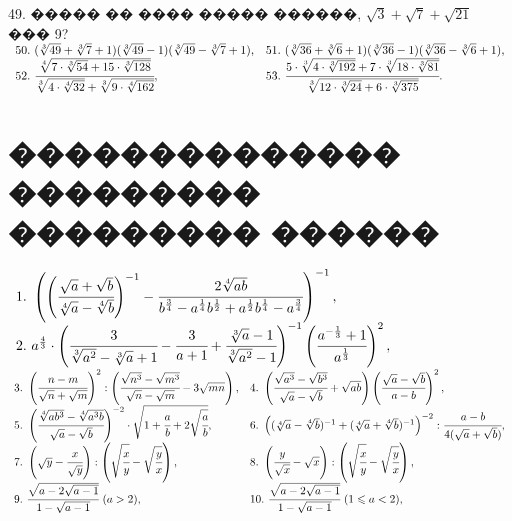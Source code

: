 \documentclass[12pt]{article}
\begin{document}
49. ����� �� ���� ����� ������, $\sqrt{3}+\sqrt{7}+\sqrt{21}$ ��� 9?\\
$\begin{array}{ll}
50.\ (\sqrt[3]{49}+\sqrt[3]{7}+1)(\sqrt[3]{49}-1)(\sqrt[3]{49}-\sqrt[3]{7}+1),&
51.\ (\sqrt[3]{36}+\sqrt[3]{6}+1)(\sqrt[3]{36}-1)(\sqrt[3]{36}-\sqrt[3]{6}+1),\\
52.\ \cfrac{\sqrt[4]{7\cdot\sqrt[3]{54}+15\cdot\sqrt[3]{128}}}{\sqrt[3]{4\cdot\sqrt[4]{32}}+\sqrt[3]{9\cdot\sqrt[4]{162}}},&
53.\ \cfrac{5\cdot\sqrt[3]{4\cdot\sqrt[3]{192}}+7\cdot\sqrt[3]{18\cdot\sqrt[3]{81}}}{\sqrt[3]{12\cdot
\sqrt[3]{24}+6\cdot\sqrt[3]{375}}}.
\end{array}$
\newpage
\section{�������������� ��������� ��������� ������}
$\begin{array}{ll}
1.\ \left(\left(\cfrac{\sqrt{a}+\sqrt{b}}{\sqrt[4]{a}-\sqrt[4]{b}}\right)^{-1}-
\cfrac{2\sqrt[4]{ab}}{b^{\frac{3}{4}}-a^{\frac{1}{4}}b^{\frac{1}{2}}+
a^{\frac{1}{2}}b^{\frac{1}{4}}-a^{\frac{3}{4}}}\right)^{-1},\\
2.\ a^{\frac{4}{3}}\cdot\left(\cfrac{3}{\sqrt[3]{a^2}-\sqrt[3]{a}+1}-
\cfrac{3}{a+1}+\cfrac{\sqrt[3]{a}-1}{\sqrt[3]{a^2}-1}\right)^{-1}
\left(\cfrac{a^{-\frac{1}{3}}+1}{a^\frac{1}{3}}\right)^2,\\
\end{array}$\\
$\begin{array}{ll}
3.\ \left(\cfrac{n-m}{\sqrt{n}+\sqrt{m}}\right)^2:\left(\cfrac{\sqrt{n^3}-\sqrt{m^3}}{\sqrt{n}-\sqrt{m}}-
3\sqrt{mn}\right),&
4.\ \left(\cfrac{\sqrt{a^3}-\sqrt{b^3}}{\sqrt{a}-\sqrt{b}}+
\sqrt{ab}\right)\left(\cfrac{\sqrt{a}-\sqrt{b}}{a-b}\right)^2,\\
5.\ \left(\cfrac{\sqrt[4]{ab^3}-\sqrt[4]{a^3b}}{\sqrt{a}-\sqrt{b}}\right)^{-2}\cdot
\sqrt{1+\cfrac{a}{b}+2\sqrt{\cfrac{a}{b}}},&
6.\ \left((\sqrt[4]{a}-\sqrt[4]{b})^{-1}+(\sqrt[4]{a}+\sqrt[4]{b})^{-1}\right)^{-2}:
\cfrac{a-b}{4(\sqrt{a}+\sqrt{b})},\\
7.\ \left(\sqrt{y}-\cfrac{x}{\sqrt{y}}\right):\left(\sqrt{\cfrac{x}{y}}-
\sqrt{\cfrac{y}{x}}\right),&
8.\ \left(\cfrac{y}{\sqrt{x}}-\sqrt{x}\right):\left(\sqrt{\cfrac{x}{y}}-
\sqrt{\cfrac{y}{x}}\right),\\
9.\ \cfrac{\sqrt{a-2\sqrt{a-1}}}{1-\sqrt{a-1}}\ (a>2),&
10.\ \cfrac{\sqrt{a-2\sqrt{a-1}}}{1-\sqrt{a-1}}\ (1\leqslant a<2),\end{array}$ \\
\end{document}

